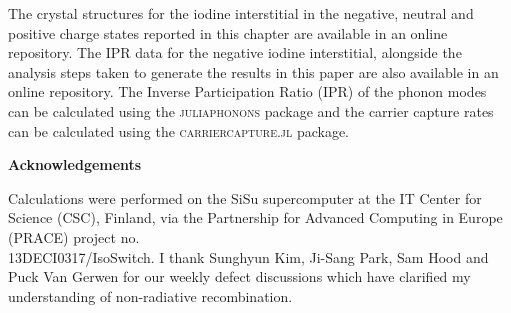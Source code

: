 The crystal structures for the iodine interstitial in the negative, neutral and positive charge states reported in this chapter are available
in an online repository.\autocite{WMD}
The IPR data for the negative iodine interstitial, alongside the analysis steps taken to generate the results in this paper are also available in an online repository.\autocite{IPRMAPI} 
The Inverse Participation Ratio (IPR) of the phonon modes can be calculated using the \textsc{juliaphonons} package\autocite{juliaphonons}
and the carrier capture rates can be calculated using the \textsc{carriercapture.jl} package.\autocite{carriercapture}

\textbf{Acknowledgements}

Calculations were performed on the SiSu supercomputer at the IT Center for Science (CSC), Finland, via the Partnership for Advanced Computing in Europe (PRACE) project no. \\13DECI0317/IsoSwitch. I thank Sunghyun Kim, Ji-Sang Park, Sam Hood and Puck Van Gerwen for our weekly defect discussions which have clarified my understanding of non-radiative recombination.
